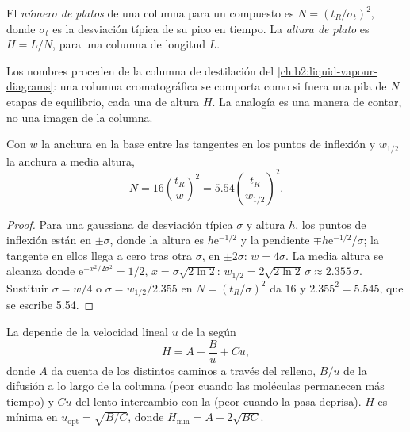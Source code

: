 \begin{definition}\label{def:b2:chromatography:plates}
El \emph{número de platos} de una columna para un compuesto es $N = (t_R/\sigma_t)^2$, donde
$\sigma_t$ es la desviación típica de su pico en tiempo. La \emph{altura de plato} es
$H = L/N$, para una columna de longitud $L$.
\end{definition}

Los nombres proceden de la columna de destilación del \cref{ch:b2:liquid-vapour-diagrams}: una columna
cromatográfica se comporta como si fuera una pila de $N$ etapas de equilibrio, cada una de altura $H$. La analogía es una manera de
contar, no una imagen de la columna.

\begin{proposition}\label{prop:b2:chromatography:plate-number}
Con $w$ la anchura en la base entre las tangentes en los puntos de inflexión y $w_{1/2}$ la anchura a
media altura,
\begin{equation*}
N = 16\left(\frac{t_R}{w}\right)^2 = 5.54\left(\frac{t_R}{w_{1/2}}\right)^2.
\end{equation*}
\end{proposition}

\begin{proof}
Para una gaussiana de desviación típica $\sigma$ y altura $h$, los puntos de inflexión están en $\pm\sigma$,
donde la altura es $h\mathrm e^{-1/2}$ y la pendiente $\mp h\mathrm e^{-1/2}/\sigma$; la tangente en ellos
llega a cero tras otra $\sigma$, en $\pm2\sigma$: $w = 4\sigma$. La media altura se alcanza donde
$\mathrm e^{-x^2/2\sigma^2} = 1/2$, $x = \sigma\sqrt{2\ln2}$: $w_{1/2} = 2\sqrt{2\ln2}\,\sigma \approx
2.355\,\sigma$. Sustituir $\sigma = w/4$ o $\sigma = w_{1/2}/2.355$ en $N = (t_R/\sigma)^2$ da
$16$ y $2.355^2 = 5.545$, que se escribe 5.54.
\end{proof}

\begin{proposition}\label{prop:b2:chromatography:van-deemter}
La  depende de la velocidad lineal $u$ de la  según
\begin{equation*}
H = A + \frac{B}{u} + Cu,
\end{equation*}
donde $A$ da cuenta de los distintos caminos a través del relleno, $B/u$ de la difusión a lo largo de la columna
(peor cuando las moléculas permanecen más tiempo) y $Cu$ del lento intercambio con la  (peor
cuando la  pasa deprisa). $H$ es mínima en $u_{\mathrm{opt}} = \sqrt{B/C}$, donde $H_{\min} =
A + 2\sqrt{BC}$.
\end{proposition}

